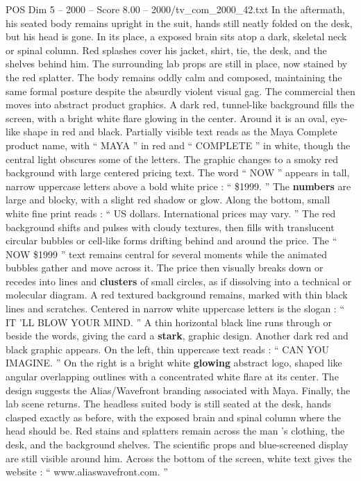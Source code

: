\begin{textsample}{POS Dim 5 – 2000 – Score 8.00 – 2000/tv\_com\_2000\_42.txt}
In the aftermath, his seated body remains upright in the suit, hands still neatly folded on the desk, but his head is gone.
In its place, a exposed brain sits atop a dark, skeletal neck or spinal column.
Red splashes cover his jacket, shirt, tie, the desk, and the shelves behind him.
The surrounding lab props are still in place, now stained by the red splatter.
The body remains oddly calm and composed, maintaining the same formal posture despite the absurdly violent visual gag.
The commercial then moves into abstract product graphics.
A dark red, tunnel-like background fills the screen, with a bright white flare glowing in the center.
Around it is an oval, eye-like shape in red and black.
Partially visible text reads as the Maya Complete product name, with “ MAYA ” in red and “ COMPLETE ” in white, though the central light obscures some of the letters.
The graphic changes to a smoky red background with large centered pricing text.
The word “ NOW ” appears in tall, narrow uppercase letters above a bold white price : “ \$1999. ” The \textbf{numbers} are large and blocky, with a slight red shadow or glow.
Along the bottom, small white fine print reads : “ US dollars.
International prices may vary. ” The red background shifts and pulses with cloudy textures, then fills with translucent circular bubbles or cell-like forms drifting behind and around the price.
The “ NOW \$1999 ” text remains central for several moments while the animated bubbles gather and move across it.
The price then visually breaks down or recedes into lines and \textbf{clusters} of small circles, as if dissolving into a technical or molecular diagram.
A red textured background remains, marked with thin black lines and scratches.
Centered in narrow white uppercase letters is the slogan : “ IT ’LL BLOW YOUR MIND. ” A thin horizontal black line runs through or beside the words, giving the card a \textbf{stark}, graphic design.
Another dark red and black graphic appears.
On the left, thin uppercase text reads : “ CAN YOU IMAGINE. ” On the right is a bright white \textbf{glowing} abstract logo, shaped like angular overlapping outlines with a concentrated white flare at its center.
The design suggests the Alias/Wavefront branding associated with Maya.
Finally, the lab scene returns.
The headless suited body is still seated at the desk, hands clasped exactly as before, with the exposed brain and spinal column where the head should be.
Red stains and splatters remain across the man ’s clothing, the desk, and the background shelves.
The scientific props and blue-screened display are still visible around him.
Across the bottom of the screen, white text gives the website : “ www.aliaswavefront.com. ”

\end{textsample}

